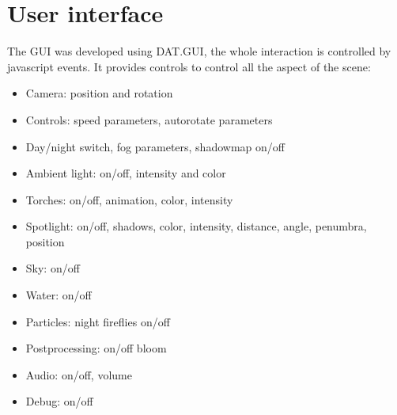 \documentclass[10pt,a4paper]{article}
\begin{document}
\section{User interface}

The GUI was developed using DAT.GUI, the whole interaction is controlled by javascript events. It provides controls to control all the aspect of the scene:
 
 \begin{itemize}
 \item Camera: position and rotation
 \item Controls: speed parameters, autorotate parameters
 \item Day/night switch, fog parameters, shadowmap on/off
 \item Ambient light: on/off, intensity and color
 \item Torches: on/off, animation, color, intensity
 \item Spotlight: on/off, shadows, color, intensity, distance, angle, penumbra, position
 \item Sky: on/off
 \item Water: on/off
 \item Particles: night fireflies on/off
 \item Postprocessing: on/off bloom
 \item Audio: on/off, volume
 \item Debug: on/off
 \end{itemize}
 
\end{document}
